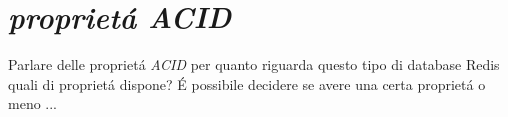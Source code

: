 \chapter{\emph{proprietá ACID}}
Parlare delle proprietá \emph{ACID} per quanto riguarda questo tipo di database
Redis quali di proprietá dispone?
É possibile decidere se avere una certa proprietá o meno ...
